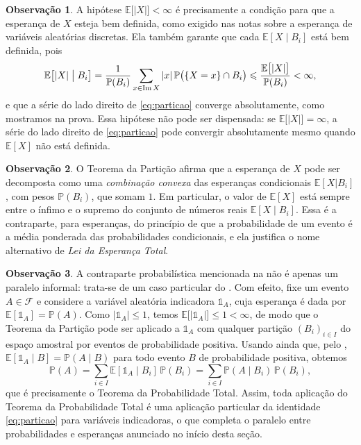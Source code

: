 \documentclass[12pt,portuguese]{article}
\theoremstyle{definition}
\newtheorem{remark}[remark]{Observação}
\begin{document}
\begin{remark}\label{rem:particao-hipotese}
A hipótese \(\mathbb{E}\bigl[|X|\bigr] < \infty\) é precisamente a condição
para que a esperança de \(X\) esteja bem definida, como exigido nas notas
sobre a esperança de variáveis aleatórias discretas. Ela também garante que
cada \(\mathbb{E}[X \mid B_i]\) está bem definida, pois
\[
\mathbb{E}\bigl[|X| \bigm| B_i\bigr]
= \frac{1}{\mathbb{P}(B_i)}
\sum_{x \in \operatorname{Im} X} |x|
\, \mathbb{P}\bigl(\{X = x\} \cap B_i\bigr)
\leqslant \frac{\mathbb{E}\bigl[|X|\bigr]}{\mathbb{P}(B_i)} < \infty,
\]
e que a série do lado direito de \eqref{eq:particao} converge
absolutamente, como mostramos na prova. Essa hipótese não pode ser
dispensada: se \(\mathbb{E}\bigl[|X|\bigr] = \infty\), a série do lado
direito de \eqref{eq:particao} pode convergir absolutamente mesmo quando
\(\mathbb{E}[X]\) não está definida.
\end{remark}

\begin{remark}\label{rem:particao-interpretacao}
O Teorema da Partição afirma que a esperança de \(X\) pode ser decomposta
como uma \emph{combinação convexa} das esperanças condicionais
\(\mathbb{E}[X| B_i]\), com pesos \(\mathbb{P}(B_i)\), que somam \(1\).
Em particular, o valor de \(\mathbb{E}[X]\) está sempre entre o ínfimo e o
supremo do conjunto de números reais \(\mathbb{E}[X \mid B_i]\). Essa é a contraparte, para esperanças,
  do princípio de que a probabilidade de um evento é a média ponderada das
  probabilidades condicionais, e ela justifica o nome alternativo de \emph{Lei
  da Esperança Total}.
\end{remark}

\begin{remark}\label{rem:particao-recupera-probabilidade-total}
A contraparte probabilística mencionada na 
não é apenas um paralelo informal: trata-se de um caso particular do
. Com efeito, fixe um evento
\(A \in \mathcal{F}\) e considere a variável aleatória indicadora
\(\mathds{1}_A\), cuja esperança é dada por
\(\mathbb{E}[\mathds{1}_A] = \mathbb{P}(A)\). Como
\(|\mathds{1}_A| \leqslant 1\), temos
\(\mathbb{E}\bigl[|\mathds{1}_A|\bigr] \leqslant 1 < \infty\), de modo que o
Teorema da Partição pode ser aplicado a \(\mathds{1}_A\) com qualquer partição
\((B_i)_{i \in I}\) do espaço amostral por eventos de probabilidade positiva.
Usando ainda que, pelo ,
\(\mathbb{E}[\mathds{1}_A \mid B] = \mathbb{P}(A \mid B)\) para todo evento
\(B\) de probabilidade positiva, obtemos
\[
\mathbb{P}(A)
= \sum_{i \in I} \mathbb{E}[\mathds{1}_A \mid B_i]\,\mathbb{P}(B_i)
= \sum_{i \in I} \mathbb{P}(A \mid B_i)\,\mathbb{P}(B_i),
\]
que é precisamente o Teorema da Probabilidade Total. Assim, toda aplicação do
Teorema da Probabilidade Total é uma aplicação particular da identidade
\eqref{eq:particao} para variáveis indicadoras, o que completa o paralelo
entre probabilidades e esperanças anunciado no início desta seção.
\end{remark}
\end{document}
